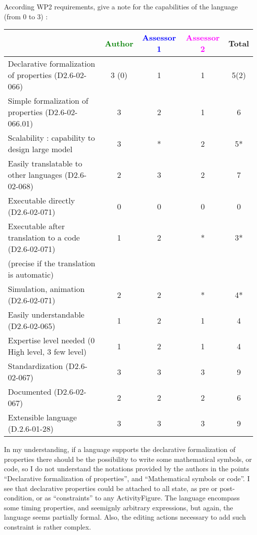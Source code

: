 According WP2 requirements, give a note for the capabilities of the language (from 0 to 3) :

\begin{tabular}{|l | c | c | c | c|}
\hline
& \textcolor{green}{Author} & \textcolor{blue}{Assessor 1} & \textcolor{magenta}{Assessor 2} & Total \\
\hline
Declarative formalization of properties (D2.6-02-066) & 3 (0) & 1 & 1 & 5(2) \\
\hline
Simple formalization of properties (D2.6-02-066.01) & 3 &  2 & 1 & 6 \\
\hline
Scalability : capability to design large model & 3 & * & 2 & 5* \\
\hline
Easily translatable to other languages (D2.6-02-068) & 2 & 3 & 2 & 7 \\
\hline
Executable directly (D2.6-02-071) & 0 & 0 & 0 & 0 \\
\hline
Executable after translation to a code (D2.6-02-071) & 1 & 2 & * & 3* \\
(precise if the translation is automatic) & & & & \\
\hline
Simulation, animation (D2.6-02-071) & 2 & 2 & * & 4* \\
\hline
Easily understandable (D2.6-02-065) & 1 & 2 &  1 & 4 \\
\hline
Expertise level needed (0 High level, 3 few level) & 1 & 2 &  1 & 4 \\
\hline
Standardization (D2.6-02-067) & 3 & 3 & 3 & 9 \\
\hline
Documented (D2.6-02-067) & 2 & 2 & 2 & 6 \\
\hline
Extensible language (D.2.6-01-28) & 3 & 3 & 3 & 9 \\
\hline
\end{tabular}

\begin{assessor1}
In my understanding, if a language supports the declarative formalization of properties there should be the possibility to write some mathematical symbols, or code, so I do not understand the notations provided by the authors in the points
"`Declarative formalization of properties"', and "`Mathematical symbols or code"'. I see that declarative properties could be attached to all state, as pre or post-condition, or as "`constraints"' to any ActivityFigure. The language encompass some timing properties, and seemignly arbitrary expressions, but again, the language seems partially formal. Also, the editing actions necessary to add such constraint is rather complex. 
\end{assessor1}

